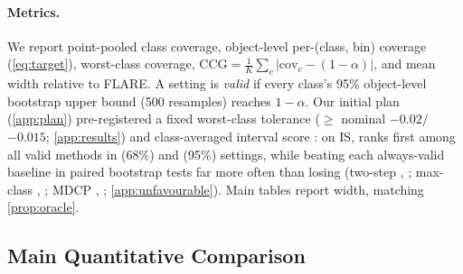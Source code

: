 \paragraph{Metrics.}
We report point-pooled class coverage, object-level per-(class, bin) coverage (\cref{eq:target}), worst-class coverage, $\mathrm{CCG}=\frac1K\sum_c|\mathrm{cov}_c-(1-\alpha)|$, and mean width relative to FLARE.
A setting is \emph{valid} if every class's 95\% object-level bootstrap upper bound (500 resamples) reaches $1-\alpha$.
Our initial plan (\cref{app:plan}) pre-registered a fixed worst-class tolerance ($\ge$ nominal $-0.02$/$-0.015$; \cref{app:results}) and class-averaged interval score \citep[IS;][]{gneiting2007strictly}: on IS, \gamut{} ranks first among all valid methods in \ISWinsGamutSixtyeight{} (68\%) and \ISWinsGamutNinetyfive{} (95\%) settings, while beating each always-valid baseline in paired bootstrap tests far more often than losing (two-step \ISVsTwoStepGamutSixtyeight{}, \ISVsTwoStepGamutNinetyfive{}; max-class \ISVsMaxClassGamutSixtyeight{}, \ISVsMaxClassGamutNinetyfive{}; MDCP \ISVsMDGamutSixtyeight{}, \ISVsMDGamutNinetyfive{}; \cref{app:unfavourable}). Main tables report width, matching \cref{prop:oracle}.

\subsection{Main Quantitative Comparison}



